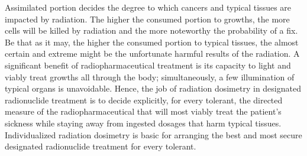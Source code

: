 \documentclass[12pt]{article}
\begin{document}
\par
Assimilated portion decides the degree to which cancers and typical tissues are impacted by radiation. The higher the consumed portion to growths, the more cells will be killed by radiation and the more noteworthy the probability of a fix. Be that as it may, the higher the consumed portion to typical tissues, the almost certain and extreme might be the unfortunate harmful results of the radiation. A significant benefit of radiopharmaceutical treatment is its capacity to light and viably treat growths all through the body; simultaneously, a few illumination of typical organs is unavoidable. Hence, the job of radiation dosimetry in designated radionuclide treatment is to decide explicitly, for every tolerant, the directed measure of the radiopharmaceutical that will most viably treat the patient's sickness while staying away from ingested dosages that harm typical tissues. Individualized radiation dosimetry is basic for arranging the best and most secure designated radionuclide treatment for every tolerant.
\end{document}
